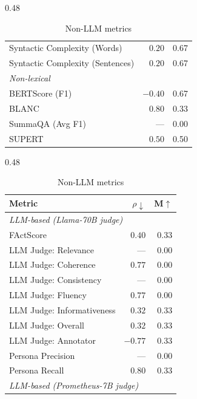 \begin{table}[htbp]
\begin{subtable}[t]{0.48\textwidth}
\begin{tabular}{lrr}
\rowcolor{matchFalse} Syntactic Complexity (Words)          &   $0.20$ &  0.67 \\
\rowcolor{matchFalse} Syntactic Complexity (Sentences)      &   $0.20$ &  0.67 \\
\midrule
\multicolumn{3}{l}{\textit{Non-lexical}} \\
\midrule
\rowcolor{matchTrue} BERTScore (F1)                        &  $-0.40$ &  0.67 \\
\rowcolor{matchFalse} BLANC                                 &   $0.80$ &  0.33 \\
\rowcolor{matchFalse} SummaQA (Avg F1)                      &      --- &  0.00 \\
\rowcolor{matchFalse} SUPERT                                &   $0.50$ &  0.50 \\
\bottomrule
\end{tabular}
\caption{Non-LLM metrics}
\end{subtable}
\hfill
\begin{subtable}[t]{0.48\textwidth}
\centering
\begin{tabular}{lrr}
\toprule
Metric & $\rho\downarrow$ & M$\uparrow$ \\
\midrule
\multicolumn{3}{l}{\textit{LLM-based (Llama-70B judge)}} \\
\midrule
\rowcolor{matchFalse} FActScore                             &   $0.40$ &  0.33 \\
\rowcolor{matchFalse} LLM Judge: Relevance                  &      --- &  0.00 \\
\rowcolor{matchFalse} LLM Judge: Coherence                  &   $0.77$ &  0.00 \\
\rowcolor{matchFalse} LLM Judge: Consistency                &      --- &  0.00 \\
\rowcolor{matchFalse} LLM Judge: Fluency                    &   $0.77$ &  0.00 \\
\rowcolor{matchFalse} LLM Judge: Informativeness            &   $0.32$ &  0.33 \\
\rowcolor{matchFalse} LLM Judge: Overall                    &   $0.32$ &  0.33 \\
\rowcolor{matchTrue} LLM Judge: Annotator        &  $-0.77$ &  0.33 \\
\rowcolor{matchFalse} Persona Precision                     &      --- &  0.00 \\
\rowcolor{matchFalse} Persona Recall                        &   $0.80$ &  0.33 \\
\midrule
\multicolumn{3}{l}{\textit{LLM-based (Prometheus-7B judge)}} \\

\end{tabular}
\end{subtable}
\end{table}
